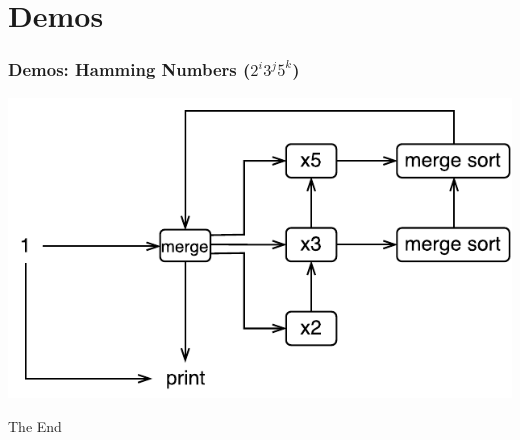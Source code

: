 \documentclass{beamer}
\newenvironment{mysubsec}[1]
{   \begin{frame}
	\frametitle{#1} }
{ \end{frame} }
\begin{document}
\section{Demos}
	\begin{mysubsec}{Demos: Hamming Numbers ($ 2^i 3^j 5^k $)}
	\includegraphics[scale=0.8,keepaspectratio]{pics/Hamming.pdf}
	\end{mysubsec}
\begin{frame}
	\Huge{\centerline{The End}}
\end{frame}
\end{document}
